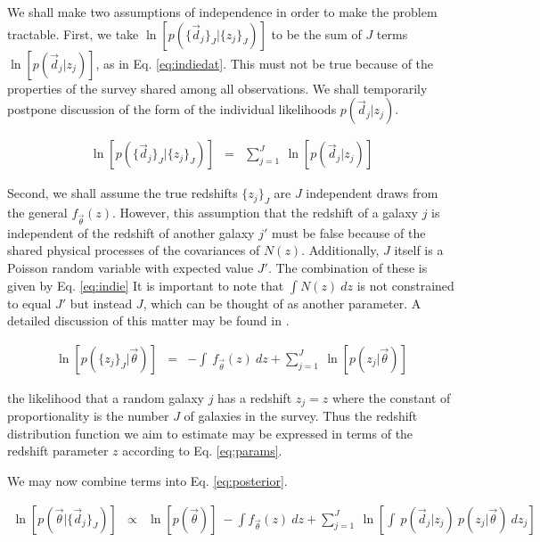 \documentclass[preprint]{aastex}
\begin{document}
We shall make two assumptions of independence in order to make the problem 
tractable.  First, we take $\ln[p(\{\vec{d}_{j}\}_{J}|\{z_{j}\}_{J})]$ to be 
the sum of $J$ terms $\ln[p(\vec{d}_{j}|z_{j})]$, as in Eq. \ref{eq:indiedat}.  
This must not be true because of the properties of the survey shared among all 
observations.  We shall temporarily postpone discussion of the form of the 
individual likelihoods $p(\vec{d}_{j}|z_{j})$.  

\begin{eqnarray}
\label{eq:indiedat}
\ln[p(\{\vec{d}_{j}\}_{J}|\{z_{j}\}_{J})] &=& \sum_{j=1}^{J}\ 
\ln[p(\vec{d}_{j}|z_{j})]
\end{eqnarray}

Second, we shall assume the true redshifts $\{z_{j}\}_{J}$ are $J$ independent 
draws from the general $f_{\vec{\theta}}(z)$.  However, this assumption that 
the redshift of a galaxy $j$ is independent of the redshift of another galaxy 
$j'$ must be false because of the shared physical processes of the covariances 
of $N(z)$.  Additionally, $J$ itself is a Poisson random variable with expected 
value $J'$.  The combination of these is given by Eq. \ref{eq:indie}  It is 
important to note that $\int N(z)\ dz$ is not constrained to equal $J'$ but 
instead $J$, which can be thought of as another parameter.  A detailed 
discussion of this matter may be found in \citet{for14}.

\begin{eqnarray}
\label{eq:indie}
\ln[p(\{z_{j}\}_{J}|\vec{\theta})] &=& -\int\ f_{\vec{\theta}}(z)\ dz +  
\sum_{j=1}^{J}\ \ln[p(z_{j}|\vec{\theta})]
\end{eqnarray}

the likelihood that a random galaxy $j$ has a redshift $z_{j}=z$ where the 
constant of proportionality is the number $J$ of galaxies in the survey.  Thus 
the redshift distribution function we aim to estimate may be expressed in terms 
of the redshift parameter $z$ according to Eq. \ref{eq:params}.  

We may now combine terms into Eq. \ref{eq:posterior}.

\begin{eqnarray}
\label{eq:posterior}
\ln[p(\vec{\theta}|\{\vec{d}_{j}\}_{J})] &\propto& \ln[p(\vec{\theta})]\ -\int 
f_{\vec{\theta}}(z)\ dz + \sum_{j=1}^{J}\ \ln\left[\int\ p(\vec{d}_{j}|z_{j})\ 
p(z_{j}|\vec{\theta})\ dz_{j}\right]
\end{eqnarray}
\end{document}
